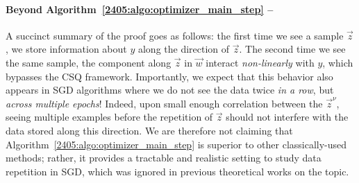 \paragraph{Beyond Algorithm~\ref{2405:algo:optimizer_main_step} --} A succinct summary of the proof goes as follows: the first time we see a sample $\vec{z}$, we store information about $y$ along the direction of $\vec{z}$. The second time we see the same sample, the component along $\vec{z}$ in $\vec{w}$ interact \emph{non-linearly} with $y$, which bypasses the CSQ framework. Importantly, we expect that this behavior also appears in SGD algorithms where we do not see the data twice \emph{in a row}, but \emph{across multiple epochs}! Indeed, upon small enough correlation between the $\vec{z}^\nu$, seeing multiple examples before the repetition of $\vec{z}$ should not interfere with the data stored along this direction.
We are therefore not claiming that Algorithm~\ref{2405:algo:optimizer_main_step} is superior to other classically-used methods; rather, it provides a tractable and realistic setting to study data repetition in SGD, which was ignored in previous theoretical works on the topic. 


